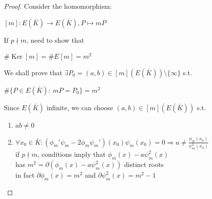\documentclass[10pt,handout]{beamer} %
\theoremstyle{definition}
\begin{document}
\begin{frame}

\begin{proof} Consider the homomorphism:\\
\centerline{\alert{$[m]:E(\bar{K})\rightarrow E(\bar{K}), P\mapsto mP$}}\pause

If $p\nmid m$, need to show that \\
\centerline{\alert{$\#\operatorname{Ker}[m]=\#E[m]=m^2$}}\pause
\medskip

We shall prove that
$\exists P_0=(a,b)\in [m](E(\bar{K}))\setminus\{\infty\}$ s.t.\\
\centerline{\alert{$\#\{P\in E(\bar{K}):\ mP=P_0\}=m^2$}}\pause
\medskip

Since $E(\bar{K})$ infinite, we can choose $(a,b)\in [m](E(\bar{K}))$ s.t. %
\begin{enumerate}[<+->]
  \item \alert{$ab\neq0$}
  \item \alert{$\forall x_0\in\bar{K}:
(\phi_m'\psi_m-2\phi_m\psi_m')(x_0)\psi_m(x_0)=0\Rightarrow a\ne \frac{\phi_{m}(x_0)}{\psi_{m}^{2}(x_0)}$}\\
\qquad if $p\nmid m$, conditions imply that \alert{$\phi_m(x)-a\psi_m^2(x)$}\\ \qquad has
$m^2=\partial(\phi_m(x)-a\psi_m^2(x))$ distinct roots\\
\qquad in fact $\partial \phi_m(x)=m^2$ and $\partial\psi_m^2(x)=m^2-1$\vspace*{-5mm}
\end{enumerate}
\end{proof}
\end{frame}
\end{document}
